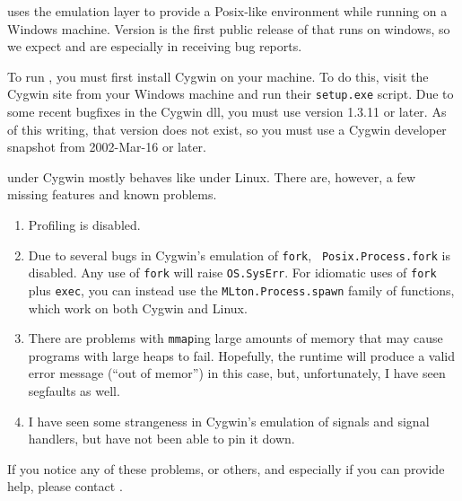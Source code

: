 
{\mlton} uses the  emulation
layer to provide a Posix-like environment while running on a Windows machine.
Version {\version} is the first public release of {\mlton} that runs on windows,
so we expect and are especially in receiving bug reports.

To run {\mlton}, you must first install Cygwin on your machine.  To do this,
visit the Cygwin site from your Windows machine and run their {\tt setup.exe}
script.  Due to some recent bugfixes in the Cygwin dll, you must use version
1.3.11 or later.  As of this writing, that version does not exist, so you must
use a Cygwin developer snapshot from 2002-Mar-16 or later.

{\mlton} under Cygwin mostly behaves like {\mlton} under Linux.  There are,
however, a few missing features and known problems.

\begin{enumerate}

\item Profiling is disabled.

\item Due to several bugs in Cygwin's emulation of {\tt fork}, {\tt
Posix.Process.fork} is disabled.  Any use of {\tt fork} will raise
{\tt OS.SysErr}.  For idiomatic uses of {\tt fork} plus {\tt exec},
you can instead use the {\tt MLton.Process.spawn} family of functions, which
work on both Cygwin and Linux.

\item There are problems with {\tt mmap}ing large amounts of memory that may
cause programs with large heaps to fail.  Hopefully, the runtime will produce a
valid error message (``out of memor'') in this case, but, unfortunately, I have
seen segfaults as well.

\item I have seen some strangeness in Cygwin's emulation of signals and
signal handlers, but have not been able to pin it down.

\end{enumerate}

If you notice any of these problems, or others, and especially if you can
provide help, please contact {\mltonmail}.


